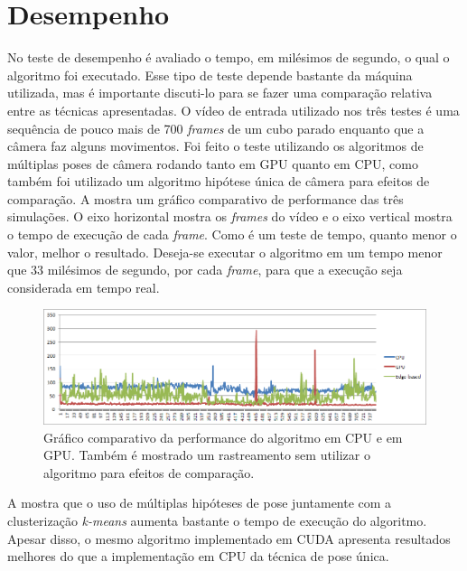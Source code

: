 \section{Desempenho}

No teste de desempenho é avaliado o tempo, em milésimos de segundo, o qual o algoritmo foi executado. Esse tipo de teste depende bastante da máquina utilizada, mas é importante discuti-lo para se fazer uma comparação relativa entre as técnicas apresentadas. O vídeo de entrada utilizado nos três testes é uma sequência de pouco mais de 700 \emph{frames} de um cubo parado enquanto que a câmera faz alguns movimentos. Foi feito o teste utilizando os algoritmos de múltiplas poses de câmera rodando tanto em GPU quanto em CPU, como também foi utilizado um algoritmo hipótese única de câmera para efeitos de comparação. A  mostra um gráfico comparativo de performance das três simulações. O eixo horizontal mostra os \emph{frames} do vídeo e o eixo vertical mostra o tempo de execução de cada \emph{frame}. Como é um teste de tempo, quanto menor o valor, melhor o resultado. Deseja-se executar o algoritmo em um tempo menor que 33 milésimos de segundo, por cada \emph{frame}, para que a execução seja considerada em tempo real.

\begin{figure}[!ht]
\centering\includegraphics[width=\textwidth]{monografia/performance}
\caption{Gráfico comparativo da performance do algoritmo em CPU e em GPU. Também é mostrado um rastreamento sem utilizar o algoritmo para efeitos de comparação.}
\label{performance}
\end{figure}

A  mostra que o uso de múltiplas hipóteses de pose juntamente com a clusterização \emph{k-means} aumenta bastante o tempo de execução do algoritmo. Apesar disso, o mesmo algoritmo implementado em CUDA apresenta resultados melhores do que a implementação em CPU da técnica de pose única.